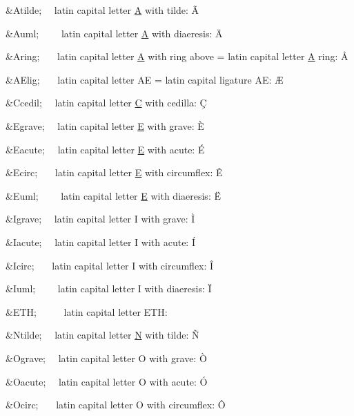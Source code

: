 \begin{DoxyItemize}
\item {\ttfamily \&Atilde;}{\ttfamily ~~} latin capital letter \mbox{\hyperlink{class_a}{A}} with tilde\+: \~{A} 
\item {\ttfamily \&Auml;}{\ttfamily ~~~~} latin capital letter \mbox{\hyperlink{class_a}{A}} with diaeresis\+: \"{A} 
\item {\ttfamily \&Aring;}{\ttfamily ~~~} latin capital letter \mbox{\hyperlink{class_a}{A}} with ring above = latin capital letter \mbox{\hyperlink{class_a}{A}} ring\+: \AA 
\item {\ttfamily \&A\+Elig;}{\ttfamily ~~~} latin capital letter AE = latin capital ligature AE\+: {\AE} 
\item {\ttfamily \&Ccedil;}{\ttfamily ~~} latin capital letter \mbox{\hyperlink{class_c}{C}} with cedilla\+: \c{C} 
\item {\ttfamily \&Egrave;}{\ttfamily ~~} latin capital letter \mbox{\hyperlink{class_e}{E}} with grave\+: \`{E} 
\item {\ttfamily \&Eacute;}{\ttfamily ~~} latin capital letter \mbox{\hyperlink{class_e}{E}} with acute\+: \'{E} 
\item {\ttfamily \&Ecirc;}{\ttfamily ~~~} latin capital letter \mbox{\hyperlink{class_e}{E}} with circumflex\+: \^{E} 
\item {\ttfamily \&Euml;}{\ttfamily ~~~~} latin capital letter \mbox{\hyperlink{class_e}{E}} with diaeresis\+: \"{E} 
\item {\ttfamily \&Igrave;}{\ttfamily ~~} latin capital letter I with grave\+: \`{I} 
\item {\ttfamily \&Iacute;}{\ttfamily ~~} latin capital letter I with acute\+: \'{I} 
\item {\ttfamily \&Icirc;}{\ttfamily ~~~} latin capital letter I with circumflex\+: \^{I} 
\item {\ttfamily \&Iuml;}{\ttfamily ~~~~} latin capital letter I with diaeresis\+: \"{I} 
\item {\ttfamily \&E\+TH;}{\ttfamily ~~~~~} latin capital letter E\+TH\+: \DH 
\item {\ttfamily \&Ntilde;}{\ttfamily ~~} latin capital letter \mbox{\hyperlink{namespace_n}{N}} with tilde\+: \~{N} 
\item {\ttfamily \&Ograve;}{\ttfamily ~~} latin capital letter O with grave\+: \`{O} 
\item {\ttfamily \&Oacute;}{\ttfamily ~~} latin capital letter O with acute\+: \'{O} 
\item {\ttfamily \&Ocirc;}{\ttfamily ~~~} latin capital letter O with circumflex\+: \^{O} 

\end{DoxyItemize}
